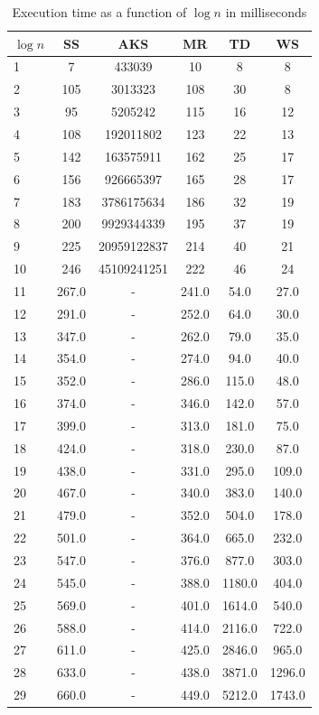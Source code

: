 \begin{table}
    \centering
    \caption{Execution time as a function of $\log n$ in milliseconds}
    \begin{tabular}{|l|c|c|c|c|c|} \hline
        $\log n$ & SS & AKS & MR & TD & WS \\
        \hline
1 & 7 & 433039 & 10 & 8 & 8 \\
2 & 105 & 3013323 & 108 & 30 & 8 \\
3 & 95 & 5205242 & 115 & 16 & 12 \\
4 & 108 & 192011802 & 123 & 22 & 13 \\
5 & 142 & 163575911 & 162 & 25 & 17 \\
6 & 156 & 926665397 & 165 & 28 & 17 \\
7 & 183 & 3786175634 & 186 & 32 & 19 \\
8 & 200 & 9929344339 & 195 & 37 & 19 \\
9 & 225 & 20959122837 & 214 & 40 & 21 \\
10 & 246 & 45109241251 & 222 & 46 & 24 \\
11 & 267.0 & - & 241.0 & 54.0 & 27.0 \\
12 & 291.0 & - & 252.0 & 64.0 & 30.0 \\
13 & 347.0 & - & 262.0 & 79.0 & 35.0 \\
14 & 354.0 & - & 274.0 & 94.0 & 40.0 \\
15 & 352.0 & - & 286.0 & 115.0 & 48.0 \\
16 & 374.0 & - & 346.0 & 142.0 & 57.0 \\
17 & 399.0 & - & 313.0 & 181.0 & 75.0 \\
18 & 424.0 & - & 318.0 & 230.0 & 87.0 \\
19 & 438.0 & - & 331.0 & 295.0 & 109.0 \\
20 & 467.0 & - & 340.0 & 383.0 & 140.0 \\
21 & 479.0 & - & 352.0 & 504.0 & 178.0 \\
22 & 501.0 & - & 364.0 & 665.0 & 232.0 \\
23 & 547.0 & - & 376.0 & 877.0 & 303.0 \\
24 & 545.0 & - & 388.0 & 1180.0 & 404.0 \\
25 & 569.0 & - & 401.0 & 1614.0 & 540.0 \\
26 & 588.0 & - & 414.0 & 2116.0 & 722.0 \\
27 & 611.0 & - & 425.0 & 2846.0 & 965.0 \\
28 & 633.0 & - & 438.0 & 3871.0 & 1296.0 \\
29 & 660.0 & - & 449.0 & 5212.0 & 1743.0 \\

\end{tabular}
\end{table}
